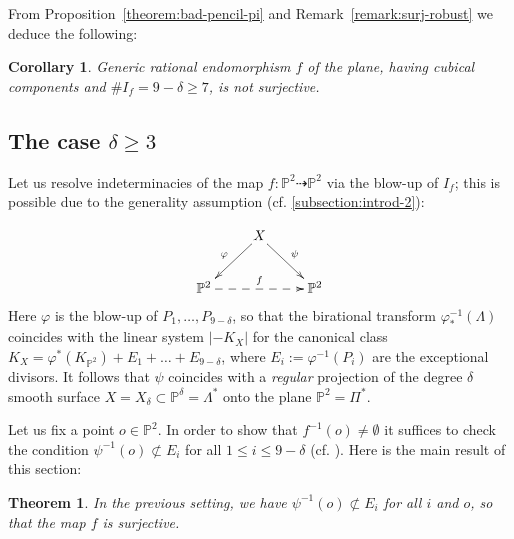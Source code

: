 \documentclass[14pt]{amsart}
\newtheorem{theorem}[equation]{Theorem}
\newtheorem{cor}[equation]{Corollary}
\theoremstyle{definition}
\theoremstyle{remark}
\newcommand{\p}{\mathbb{P}}
\begin{document}
From Proposition~\ref{theorem:bad-pencil-pi} and
Remark~\ref{remark:surj-robust} we deduce the following:

\begin{cor}
\label{theorem:bad-pencil-pi-cor} Generic rational endomorphism
$f$ of the plane, having cubical components and $\#I_f = 9 -
\delta \ge 7$, is \emph{not surjective}.
\end{cor}

\subsection{The case $\delta \ge 3$}
\label{subsection:prof-2}

Let us resolve indeterminacies of the map $f: \p^2 \dashrightarrow
\p^2$ via the blow-up of $I_f$; this is possible due to the
generality assumption (cf. {\ref{subsection:introd-2}}):

\begin{equation}
\label{diag} \xymatrix{
& X \ar[dl]_\varphi \ar[dr]^{\psi} \\
\p^2 \ar@{-->}[rr]^{f} && \p^2}
\end{equation}
Here $\varphi$ is the blow-up of $P_1,\ldots,P_{9 - \delta}$, so
that the birational transform $\varphi_*^{-1}(\Lambda)$ coincides
with the linear system $|-K_X|$ for the canonical class $K_X =
\varphi^*(K_{\p^2}) + E_1 + \ldots + E_{9 - \delta}$, where $E_i
:= \varphi^{-1}(P_i)$ are the exceptional divisors. It follows
that $\psi$ coincides with a \emph{regular} projection of the
degree $\delta$ smooth surface $X = X_\delta \subset \p^\delta =
\Lambda^*$ onto the plane $\p^2 = \Pi^*$.

Let us fix a point $o \in \p^2$. In order to show that $f^{-1}(o)
\ne \emptyset$ it suffices to check the condition $\psi^{-1}(o)
\not\subset E_i$ for all $1 \le i \le  9 - \delta$ (cf.
\cite[Proposition 3]{Kul-Zhd}). Here is the main result of this
section:

\begin{theorem}
\label{theorem:main} In the previous setting, we have
$\psi^{-1}(o) \not\subset E_i$ for all $i$ and $o$, so that the
map $f$ is surjective.
\end{theorem}
\end{document}
